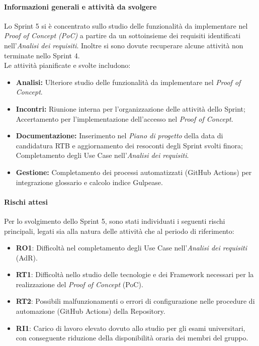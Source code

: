 \documentclass[a4paper,12pt]{article}
\begin{document}
\paragraph{Informazioni generali e attività da svolgere}
Lo Sprint 5 si è concentrato sullo studio delle funzionalità da implementare nel \textit{Proof of Concept (PoC)} a partire da un sottoinsieme dei requisiti identificati nell'\textit{Analisi dei requisiti}. Inoltre si sono dovute recuperare alcune attività non terminate nello Sprint 4.\\
Le attività pianificate e svolte includono:
\begin{itemize}
    \item \textbf{Analisi:} Ulteriore studio delle funzionalità da implementare nel \textit{Proof of Concept}.
    \item \textbf{Incontri:} Riunione interna per l'organizzazione delle attività dello Sprint; Accertamento per l'implementazione dell'accesso nel \textit{Proof of Concept}.
    \item \textbf{Documentazione:} Inserimento nel \textit{Piano di progetto} della data di candidatura RTB e aggiornamento dei resoconti degli Sprint svolti finora; Completamento degli Use Case nell'\textit{Analisi dei requisiti}.
    \item \textbf{Gestione:} Completamento dei processi automatizzati (GitHub Actions) per integrazione glossario e calcolo indice Gulpease.
\end{itemize}

\paragraph{Rischi attesi}
Per lo svolgimento dello Sprint 5, sono stati individuati i seguenti rischi principali, legati sia alla natura delle attività che al periodo di riferimento:

\begin{itemize}
    \item \textbf{RO1}: Difficoltà nel completamento degli Use Case nell'\textit{Analisi dei requisiti} (AdR).
    \item \textbf{RT1}: Difficoltà nello studio delle tecnologie e dei Framework necessari per la realizzazione del \textit{Proof of Concept} (PoC).
    \item \textbf{RT2}: Possibili malfunzionamenti o errori di configurazione nelle procedure di automazione (GitHub Actions) della Repository.
    \item \textbf{RI1}: Carico di lavoro elevato dovuto allo studio per gli esami universitari, con conseguente riduzione della disponibilità oraria dei membri del gruppo.
\end{itemize}
\end{document}

